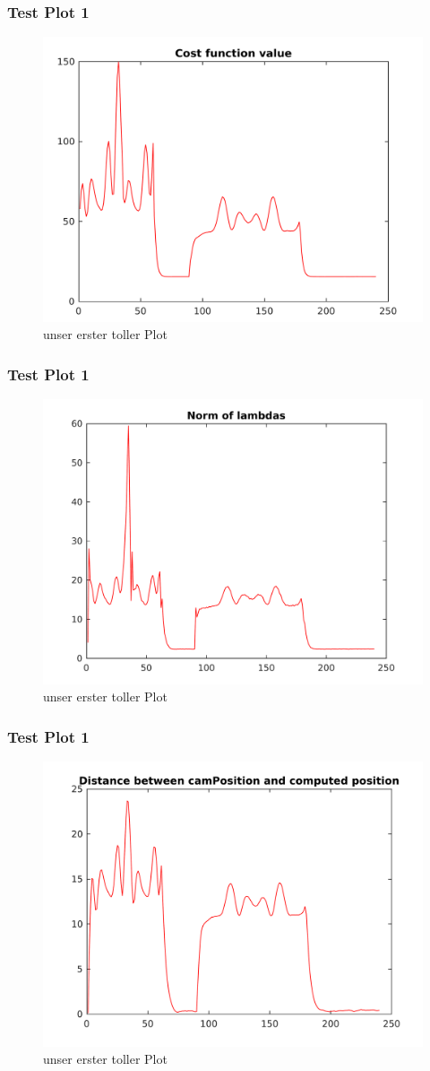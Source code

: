 \begin{frame}
	\frametitle{Test Plot 1}
	\begin{figure}%
	\includegraphics[width=0.75\columnwidth]{images/costF}%
	\caption{unser erster toller Plot}
	\end{figure}
\end{frame}

\begin{frame}
	\frametitle{Test Plot 1}
	\begin{figure}%
	\includegraphics[width=0.75\columnwidth]{images/norm_lambda}%
	\caption{unser erster toller Plot}
	\end{figure}
\end{frame}

\begin{frame}
	\frametitle{Test Plot 1}
	\begin{figure}%
	\includegraphics[width=0.75\columnwidth]{images/norm_t}%
	\caption{unser erster toller Plot}
	\end{figure}
\end{frame}

